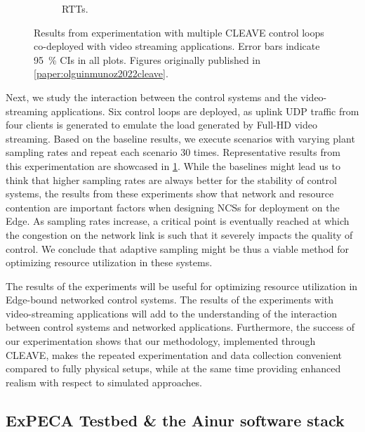 \begin{figure}[t]
\begin{subfigure}[t]{.45\textwidth}
        \caption{\glspl{RTT}.}%
    \end{subfigure}%
    \caption{
        Results from experimentation with multiple \gls{CLEAVE} control loops co-deployed with video streaming applications.
        Error bars indicate \SI{95}{\percent} \glspl{CI} in all plots.
        Figures originally published in \cref{paper:olguinmunoz2022cleave}.
    }\label{fig:cleaveresults}
\end{figure}

Next, we study the interaction between the control systems and the video-streaming applications.
Six control loops are deployed, as uplink \gls{UDP} traffic from four clients is generated to emulate the load generated by Full-HD video streaming.
Based on the baseline results, we execute scenarios with varying plant sampling rates and repeat each scenario \num{30} times.
Representative results from this experimentation are showcased in \cref{fig:cleaveresults}.
While the baselines might lead us to think that higher sampling rates are always better for the stability of control systems, the results from these experiments show that network and resource contention are important factors when designing \glspl{NCS} for deployment on the Edge.
As sampling rates increase, a critical point is eventually reached at which the congestion on the network link is such that it severely impacts the quality of control.
We conclude that adaptive sampling might be thus a viable method for optimizing resource utilization in these systems.

The results of the experiments will be useful for optimizing resource utilization in Edge-bound networked control systems.
The results of the experiments with video-streaming applications will add to the understanding of the interaction between control systems and networked applications.
Furthermore, the success of our experimentation shows that our methodology, implemented through \gls{CLEAVE}, makes the repeated experimentation and data collection convenient compared to fully physical setups, while at the same time providing enhanced realism with respect to simulated approaches.

\subsection{ExPECA Testbed \& the Ainur software stack}\label{sec:testbed}


